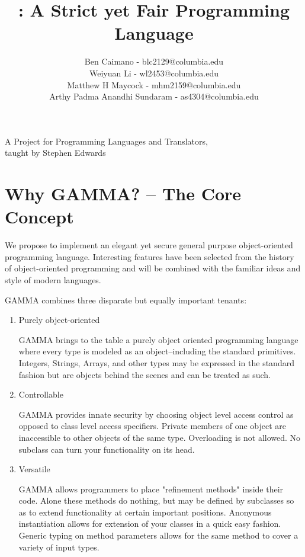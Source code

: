 \documentclass[10pt]{article}
\title{\Lang{}: A Strict yet Fair Programming Language}
\author{
	Ben Caimano - blc2129@columbia.edu \\
	Weiyuan Li - wl2453@columbia.edu \\
	Matthew H Maycock - mhm2159@columbia.edu \\
	Arthy Padma Anandhi Sundaram - as4304@columbia.edu
}
\date{}
\newcommand{\Lang}{GAMMA}
\begin{document}
\maketitle
\begin{center}
\large
A Project for Programming Languages and Translators,
\\taught by Stephen Edwards
\end{center}


\section*{Why \Lang{}? -- The Core Concept}
We propose to implement an elegant yet secure general purpose object-oriented programming language. Interesting features have been selected from the history of object-oriented programming and will be combined with the familiar ideas and style of modern languages.

\Lang{} combines three disparate but equally important tenants:


\begin{enumerate}
\item{Purely object-oriented 
    
    \Lang{} brings to the table a purely object oriented programming language where every type is
    modeled as an object--including the standard primitives. Integers, Strings, Arrays, and other types may be expressed in the standard fashion but are objects behind the scenes and can be treated as such.}

\item{Controllable

   \Lang{} provides innate security by choosing object level access
   control as opposed to class level access specifiers. Private members of one object
   are inaccessible to other objects of the same type. Overloading is not allowed.
   No subclass can turn your functionality on its head.}

\item{Versatile

    \Lang{} allows programmers to place "refinement methods" inside their code.
    Alone these methods do nothing, but may be defined by subclasses so as to extend
    functionality at certain important positions. Anonymous instantiation allows for
    extension of your classes in a quick easy fashion. Generic typing on method
    parameters allows for the same method to cover a variety of input types.}
\end{enumerate}
\end{document}
